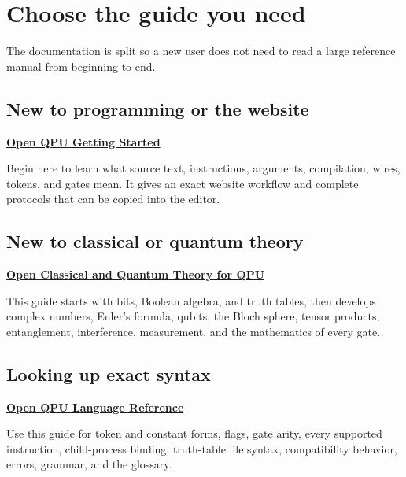 \newcommand{\QpuDocTitle}{QPU Documentation Suite}
\newcommand{\QpuDocSubtitle}{Start Here}
\newcommand{\QpuHeaderTitle}{Documentation Suite}
\newcommand{\QpuDocDescription}{%
This short index points to four focused guides: a beginner walkthrough,
classical and quantum theory, the complete QPU language reference, and worked
examples with troubleshooting.
}



\QpuTitlePage
\QpuContents

\section{Choose the guide you need}

The documentation is split so a new user does not need to read a large
reference manual from beginning to end.

\subsection{New to programming or the website}

\textbf{\href{QPU_Getting_Started.pdf}{Open QPU Getting Started}}

Begin here to learn what source text, instructions, arguments, compilation,
wires, tokens, and gates mean. It gives an exact website workflow and complete
protocols that can be copied into the editor.

\subsection{New to classical or quantum theory}

\textbf{\href{QPU_Theory_Guide.pdf}{Open Classical and Quantum Theory for QPU}}

This guide starts with bits, Boolean algebra, and truth tables, then develops
complex numbers, Euler's formula, qubits, the Bloch sphere, tensor products,
entanglement, interference, measurement, and the mathematics of every gate.

\subsection{Looking up exact syntax}

\textbf{\href{QPU_Language_Reference.pdf}{Open QPU Language Reference}}

Use this guide for token and constant forms, flags, gate arity, every supported
instruction, child-process binding, truth-table file syntax, compatibility
behavior, errors, grammar, and the glossary.

